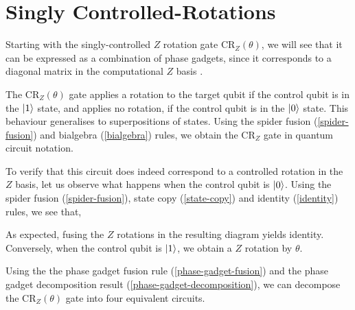 \section{Singly Controlled-Rotations}

Starting with the singly-controlled $Z$ rotation gate CR$_Z(\theta)$, we will see that it can be expressed as a combination of phase gadgets, since it corresponds to a diagonal matrix in the computational $Z$ basis \cite{Yeung2020}.


The CR$_Z(\theta)$ gate applies a rotation to the target qubit if the control qubit is in the $\ket 1$ state, and applies no rotation, if the control qubit is in the $\ket 0$ state. This behaviour generalises to superpositions of states. Using the spider fusion (\ref{spider-fusion}) and bialgebra (\ref{bialgebra}) rules, we obtain the CR$_Z$ gate in quantum circuit notation.


To verify that this circuit does indeed correspond to a controlled rotation in the $Z$ basis, let us observe what happens when the control qubit is $\ket 0$. Using the spider fusion (\ref{spider-fusion}), state copy (\ref{state-copy}) and identity (\ref{identity}) rules, we see that,


As expected, fusing the $Z$ rotations in the resulting diagram yields identity. Conversely, when the control qubit is $\ket 1$, we obtain a $Z$ rotation by $\theta$.


Using the the phase gadget fusion rule (\ref{phase-gadget-fusion}) and the phase gadget decomposition result (\ref{phase-gadget-decomposition}), we can decompose the CR$_Z(\theta)$ gate into four equivalent circuits.

